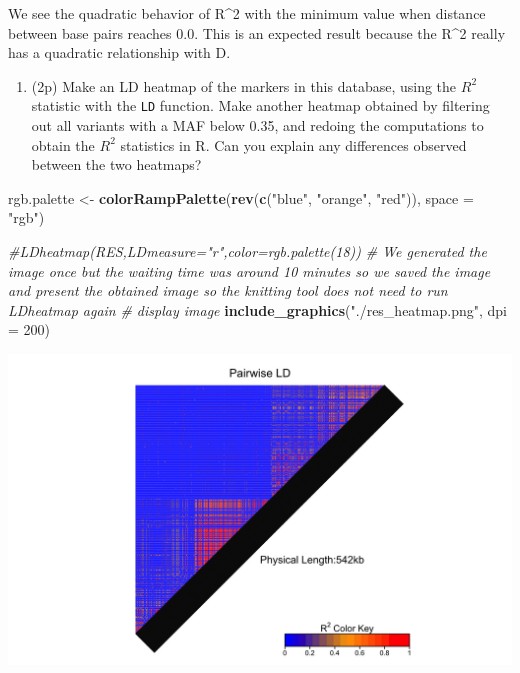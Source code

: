 \documentclass[
]{article}
\newenvironment{Shaded}{\begin{snugshade}}{\end{snugshade}}
\newcommand{\CommentTok}[1]{\textcolor[rgb]{0.56,0.35,0.01}{\textit{#1}}}
\newcommand{\DataTypeTok}[1]{\textcolor[rgb]{0.13,0.29,0.53}{#1}}
\newcommand{\DecValTok}[1]{\textcolor[rgb]{0.00,0.00,0.81}{#1}}
\newcommand{\KeywordTok}[1]{\textcolor[rgb]{0.13,0.29,0.53}{\textbf{#1}}}
\newcommand{\NormalTok}[1]{#1}
\newcommand{\StringTok}[1]{\textcolor[rgb]{0.31,0.60,0.02}{#1}}
\providecommand{\tightlist}{%
  \setlength{\itemsep}{0pt}\setlength{\parskip}{0pt}}
\begin{document}
We see the quadratic behavior of R\^{}2 with the minimum value when
distance between base pairs reaches 0.0. This is an expected result
because the R\^{}2 really has a quadratic relationship with D.

\begin{enumerate}
\def\labelenumi{\arabic{enumi}.}
\setcounter{enumi}{8}
\tightlist
\item
  (2p) Make an LD heatmap of the markers in this database, using the
  \(R^2\) statistic with the \texttt{LD} function. Make another heatmap
  obtained by filtering out all variants with a MAF below 0.35, and
  redoing the computations to obtain the \(R^2\) statistics in R. Can
  you explain any differences observed between the two heatmaps?
\end{enumerate}

\begin{Shaded}
\begin{Highlighting}[]
\NormalTok{rgb.palette <-}\StringTok{ }\KeywordTok{colorRampPalette}\NormalTok{(}\KeywordTok{rev}\NormalTok{(}\KeywordTok{c}\NormalTok{(}\StringTok{"blue"}\NormalTok{, }\StringTok{"orange"}\NormalTok{, }\StringTok{"red"}\NormalTok{)), }\DataTypeTok{space =} \StringTok{"rgb"}\NormalTok{)}

\CommentTok{#LDheatmap(RES,LDmeasure="r",color=rgb.palette(18))}
\CommentTok{# We generated the image once but the waiting time was around 10 minutes so we saved the image and present the obtained image so the knitting tool does not need to run LDheatmap again}
\CommentTok{# display image}
\KeywordTok{include_graphics}\NormalTok{(}\StringTok{"./res_heatmap.png"}\NormalTok{, }\DataTypeTok{dpi =} \DecValTok{200}\NormalTok{)}
\end{Highlighting}
\end{Shaded}

\includegraphics[width=7in]{./res_heatmap}
\end{document}
